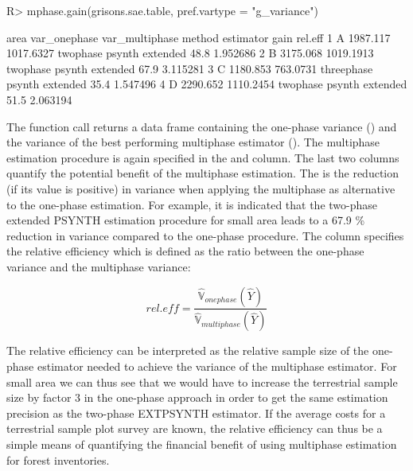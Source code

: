 \documentclass[article]{jss}
\newcommand{\var}{\mathbb{V}}
\begin{document}
\begin{Schunk}
\begin{Sinput}
R> mphase.gain(grisons.sae.table, pref.vartype = "g_variance")
\end{Sinput}
\begin{Soutput}
  area var_onephase var_multiphase     method       estimator gain  rel.eff
1    A     1987.117      1017.6327   twophase psynth extended 48.8 1.952686
2    B     3175.068      1019.1913   twophase psynth extended 67.9 3.115281
3    C     1180.853       763.0731 threephase psynth extended 35.4 1.547496
4    D     2290.652      1110.2454   twophase psynth extended 51.5 2.063194
\end{Soutput}
\end{Schunk}


The function call returns a data frame containing the one-phase variance () and the variance of the best performing multiphase estimator (). The multiphase estimation procedure is again specified in the  and  column. The last two columns quantify the potential benefit of the multiphase estimation. The  is the reduction (if its value is positive) in variance when applying the multiphase as alternative to the one-phase estimation. For example, it is indicated that the two-phase extended PSYNTH estimation procedure for small area  leads to a 67.9 \% reduction in variance compared to the one-phase procedure. The column  specifies the relative efficiency which is defined as the ratio between the one-phase variance and the multiphase variance:

\begin{equation}\label{eq:releff}
  rel.eff=\frac{\hat{\var}_{onephase}(\hat{Y})}{\hat{\var}_{multiphase}(\hat{Y})}
  \end{equation}

The relative efficiency can be interpreted as the relative sample size of the one-phase estimator needed to achieve the variance of the multiphase estimator. For small area  we can thus see that we would have to increase the terrestrial sample size by factor 3 in the one-phase approach in order to get the same estimation precision as the two-phase EXTPSYNTH estimator. If the average costs for a terrestrial sample plot survey are known, the relative efficiency can thus be a simple means of quantifying the financial benefit of using multiphase estimation for forest inventories.
\end{document}
